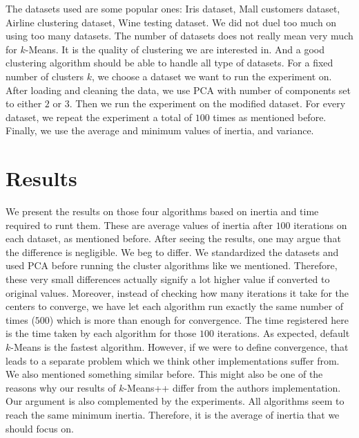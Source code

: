 \documentclass[10pt, leqno]{article}
\begin{document}
	The datasets used are some popular ones: Iris dataset, Mall customers dataset, Airline clustering dataset, Wine testing dataset. We did not duel too much on using too many datasets. The number of datasets does not really mean very much for $k$-Means. It is the quality of clustering we are interested in. And a good clustering algorithm should be able to handle all type of datasets. For a fixed number of clusters $k$, we choose a dataset we want to run the experiment on. After loading and cleaning the data, we use PCA with number of components set to either $2$ or $3$. Then we run the experiment on the modified dataset. For every dataset, we repeat the experiment a total of $100$ times as mentioned before. Finally, we use the average and minimum values of inertia, and variance.
	\section{Results}
	We present the results on those four algorithms based on inertia and time required to runt them. These are average values of inertia after $100$ iterations on each dataset, as mentioned before. After seeing the results, one may argue that the difference is negligible. We beg to differ. We standardized the datasets and used PCA before running the cluster algorithms like we mentioned. Therefore, these very small differences actually signify a lot higher value if converted to original values. Moreover, instead of checking how many iterations it take for the centers to converge, we have let each algorithm run exactly the same number of times ($500$) which is more than enough for convergence. The time registered here is the time taken by each algorithm for those $100$ iterations. As expected, default $k$-Means is the fastest algorithm. However, if we were to define convergence, that leads to a separate problem which we think other implementations suffer from. We also mentioned something similar before. This might also be one of the reasons why our results of $k$-Means++ differ from the authors implementation. Our argument is also complemented by the experiments. All algorithms seem to reach the same minimum inertia. Therefore, it is the average of inertia that we should focus on.
	
\end{document}
